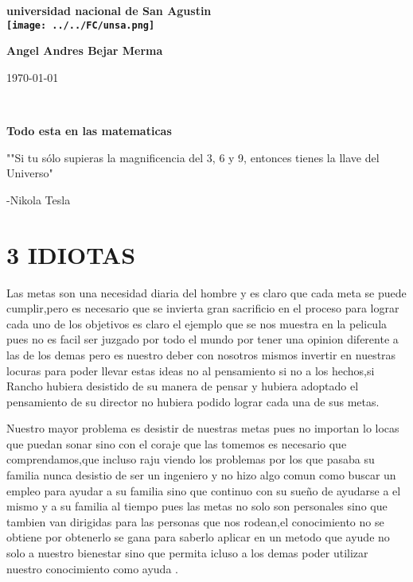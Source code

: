 \documentclass[12pt]{article}
\begin{document}
\begin{center}
\bf{\sc\Huge universidad nacional de San Agustin}\\
\vspace{20pt}
\texttt{[image: ../../FC/unsa.png]} 
\end{center}
\vspace{120pt}
\begin{center}
\bf{\sc\Huge Angel Andres Bejar Merma }\\
\end{center}
\vspace{150pt}
\begin{center}
\bf{\sc\Huge \today\par }
\end{center}
\begin{center}

\end{center}\
\newpage



\begin{center}

\bf{\sc\Huge Todo esta en las matematicas }\\
\end{center}
\begin{flushleft}
\vspace{25PT}
\large
""Si tu sólo supieras la magnificencia del 3, 6 y 9, entonces tienes la llave del Universo" 


-Nikola Tesla
\end{flushleft}
\vspace{25PT}
\section{ 3 IDIOTAS}
\large
Las metas son una necesidad diaria del hombre y es claro que cada meta se puede cumplir,pero es necesario que se invierta gran sacrificio en el proceso para lograr cada uno de los objetivos es claro el ejemplo que se nos muestra en la pelicula pues no es facil ser juzgado por todo el mundo por tener una opinion diferente a las de los demas pero es nuestro deber con nosotros mismos invertir en nuestras locuras para poder llevar estas ideas no al pensamiento si no a los hechos,si Rancho hubiera desistido de su manera de pensar y hubiera adoptado el pensamiento de su director no hubiera podido lograr cada una de sus metas.


\vspace{10PT}
Nuestro mayor problema es desistir de nuestras metas pues no importan lo locas que puedan sonar sino con el coraje que las tomemos es necesario que comprendamos,que incluso raju viendo los problemas por los que pasaba su familia nunca desistio de ser un ingeniero y no hizo algo comun como buscar un empleo para ayudar a su familia sino que continuo con su sueño de ayudarse a el mismo y a su familia al tiempo pues las metas no solo son personales sino que tambien van dirigidas para las personas que nos rodean,el conocimiento no se obtiene por obtenerlo se gana para saberlo aplicar en un metodo que ayude no solo a nuestro bienestar sino que permita icluso a los demas poder utilizar nuestro conocimiento como ayuda .
\end{document}
